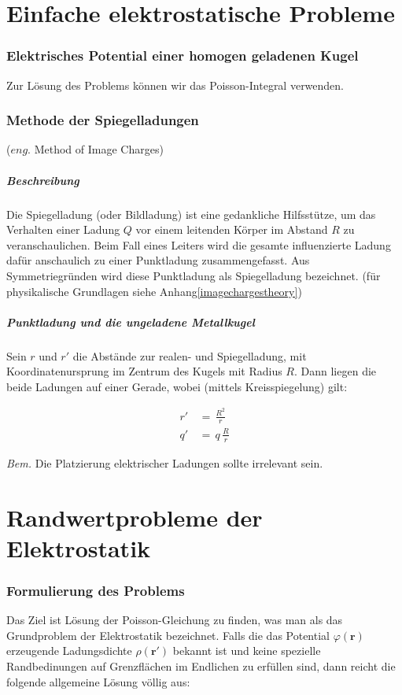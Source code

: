 \documentclass[titlepage,11pt,a4paper,ngerman]{report}
\renewcommand{\vec}[1]{\boldsymbol{#1}}
\renewcommand{\paragraph}[1]{\subsubsection{#1}}
\begin{document}
\newpage
\section{Einfache elektrostatische Probleme}
\paragraph{Elektrisches Potential einer homogen geladenen Kugel}
Zur Lösung des Problems können wir das Poisson-Integral verwenden. \cite{homkugelpot}

\paragraph{Methode der Spiegelladungen}
($eng.$ Method of Image Charges)

\subparagraph{Beschreibung}
Die Spiegelladung (oder Bildladung) ist eine gedankliche Hilfsstütze, um das Verhalten einer Ladung $Q$ vor einem leitenden Körper im Abstand $R$ zu veranschaulichen. Beim Fall eines Leiters wird die gesamte influenzierte Ladung dafür anschaulich zu einer Punktladung zusammengefasst. Aus Symmetriegründen wird diese Punktladung als Spiegelladung bezeichnet. (für physikalische Grundlagen siehe Anhang\ref{imagechargestheory})

\subparagraph{Punktladung und die ungeladene Metallkugel}
Sein $r$ und $r'$ die Abstände zur realen- und Spiegelladung, mit Koordinatenursprung im Zentrum des Kugels mit Radius $R$. Dann liegen die beide Ladungen auf einer Gerade, wobei (mittels Kreisspiegelung) gilt:

\begin{align*}
r'\,&=\,\frac{R^2}{r}\\
q'\,&=\,q\,\frac{R}{r}
\end{align*}

\emph{Bem.} Die Platzierung elektrischer Ladungen sollte irrelevant sein.

\section{Randwertprobleme der Elektrostatik}
\paragraph{Formulierung des Problems}
Das Ziel ist Lösung der Poisson-Gleichung zu finden, was man als das Grundproblem der Elektrostatik bezeichnet. Falls die das Potential $\varphi(\vec{r})$ erzeugende Ladungsdichte $\rho(\vec{r}')$ bekannt ist und keine spezielle Randbedinungen auf Grenzflächen im Endlichen zu erfüllen sind, dann reicht die folgende allgemeine Lösung völlig aus:
\end{document}
